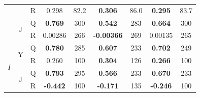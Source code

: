 \begin{table}[h!]
\begin{tabular}{|ccc|cc|cc|cc|}
        & & R & 0.298 & 82.2 & \textbf{0.306} & 86.0 & \textbf{0.295} & 83.7 \\
        \cline{2-9}
        & \multirow{2}{*}{J} & Q & \textbf{0.769} & 300 & \textbf{0.542} & 283 & \textbf{0.664} & 300 \\
        & & R & 0.00286 & 266 & \textbf{-0.00366} & 269 & 0.00135 & 265 \\
        \hline
        \multirow{4}{*}{$I$} & \multirow{2}{*}{Y} & Q & \textbf{0.780} & 285 & \textbf{0.607} & 233 & \textbf{0.702} & 249 \\
        & & R & 0.260 & 100 & \textbf{0.304} & 126 & \textbf{0.266} & 100 \\
        \cline{2-9}
        & \multirow{2}{*}{J} & Q & \textbf{0.793} & 295 & \textbf{0.566} & 233 & \textbf{0.670} & 233 \\
        & & R & \textbf{-0.442} & 100 & \textbf{-0.171} & 135 & \textbf{-0.246} & 100 \\
        \hline
    \end{tabular}    
    \label{tb:backwardsHSIphantomsann}
\end{table}

